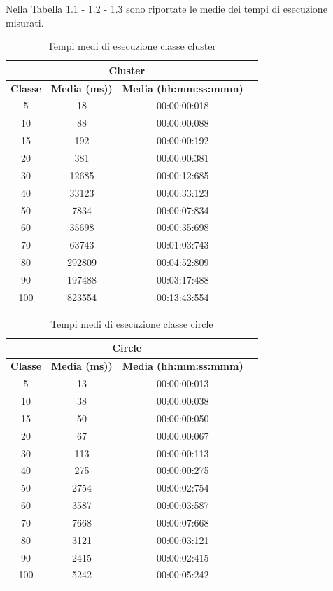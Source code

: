 Nella Tabella 1.1 - 1.2 - 1.3 sono riportate le medie dei tempi di esecuzione misurati.

\begin{table}[htbp]
\centering
\label{pt1:time:tabular_cluster}
\begin{tabular}{|c|c|c|c|}
\hline
\multicolumn{3}{|c|}{Cluster}\\
\hline
\textbf{Classe} & \textbf{Media (ms))} & \textbf{Media (hh:mm:ss:mmm)}\\
\hline
5   &     18 & 00:00:00:018\\
\hline
10  &     88 & 00:00:00:088\\
\hline
15  &    192 & 00:00:00:192\\
\hline
20  &    381 & 00:00:00:381\\
\hline
30  &  12685 & 00:00:12:685\\
\hline
40  &  33123 & 00:00:33:123\\
\hline
50  &   7834 & 00:00:07:834\\
\hline
60  &  35698 & 00:00:35:698\\
\hline
70  &  63743 & 00:01:03:743\\
\hline
80  & 292809 & 00:04:52:809\\
\hline
90  & 197488 & 00:03:17:488\\
\hline
100 & 823554 & 00:13:43:554\\
\hline
\end{tabular}
\caption{Tempi medi di esecuzione classe cluster}
\end{table}

\begin{table}[htbp]
\centering
\label{pt1:time:tabular_circle}
\begin{tabular}{|c|c|c|c|}
\hline
\multicolumn{3}{|c|}{Circle}\\
\hline
\textbf{Classe} & \textbf{Media (ms))} & \textbf{Media (hh:mm:ss:mmm)}\\
\hline
5   &     13 & 00:00:00:013\\
\hline
10  &     38 & 00:00:00:038\\
\hline
15  &     50 & 00:00:00:050\\
\hline
20  &     67 & 00:00:00:067\\
\hline
30  &    113 & 00:00:00:113\\
\hline
40  &    275 & 00:00:00:275\\
\hline
50  &   2754 & 00:00:02:754\\
\hline
60  &   3587 & 00:00:03:587\\
\hline
70  &   7668 & 00:00:07:668\\
\hline
80  &   3121 & 00:00:03:121\\
\hline
90  &   2415 & 00:00:02:415\\
\hline
100 &   5242 & 00:00:05:242\\
\hline
\end{tabular}
\caption{Tempi medi di esecuzione classe circle}
\end{table}

